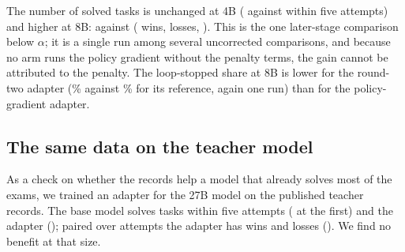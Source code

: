 The number of solved tasks is unchanged at 4B (\examFourPgFive{} against \examFourPgrefFive{} within five attempts) and
higher at 8B: \examEightPgFive{} against \examEightPgrefFive{} (\winsEightPg{} wins, \lossesEightPg{} losses,
\ptestEightPg{}). This is the one later-stage comparison below $\alpha$; it is a single run among several uncorrected
comparisons, and because no arm runs the policy gradient without the penalty terms, the gain cannot be attributed to
the penalty. The loop-stopped share at 8B is lower for the round-two adapter
(\behaviourEightRtwoExamLoopPct{}\% against \behaviourEightRtworefExamLoopPct{}\% for its reference, again one run)
than for the policy-gradient adapter.

\subsection{The same data on the teacher model}
As a check on whether the records help a model that already solves most of the exams, we trained an adapter for the
27B model on the published teacher records. The base model solves \examBigBaseFive{} tasks within five attempts
(\examBigBaseOne{} at the first) and the adapter \examBigRecordsFive{} (\examBigRecordsOne{}); paired over attempts
the adapter has \winsBigRecords{} wins and \lossesBigRecords{} losses (\ptestBigRecords{}). We find no benefit at
that size.

